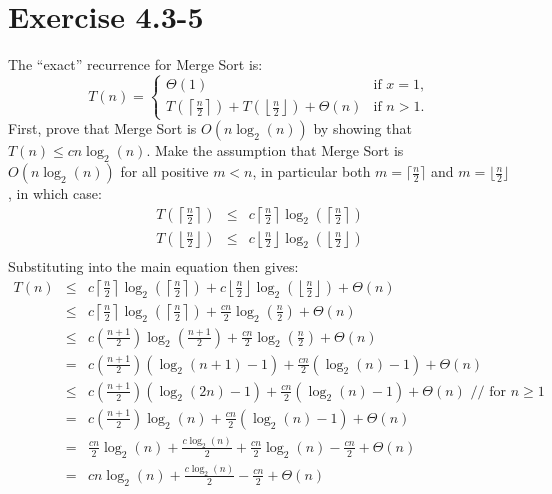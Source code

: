 \documentclass{article}
\begin{document}
\section*{Exercise 4.3-5}


The ``exact'' recurrence for Merge Sort is:
\begin{equation*} T(n) = \begin{cases} \Theta(1) & \text{if } x=1,\\ T\left(\left\lceil \frac{n}{2} \right\rceil\right) + T\left(\left\lfloor \frac{n}{2} \right\rfloor\right) + \Theta(n) & \text{if } n > 1.
	\end{cases}
\end{equation*}
First, prove that Merge Sort is $O(n\log_2(n))$ by showing that $T(n) \leq cn\log_2(n)$.  Make the assumption that Merge Sort is $O(n\log_2(n))$ for all positive $m < n$, in particular both $m = \lceil \frac{n}{2} \rceil$ and $m = \lfloor \frac{n}{2} \rfloor$, in which case:
\begin{eqnarray*}
	T\left(\left\lceil \frac{n}{2} \right\rceil\right) &\leq& c\left\lceil\frac{n}{2}\right\rceil \log_2\left(\left\lceil\frac{n}{2}\right\rceil\right) \\
	T\left(\left\lfloor \frac{n}{2} \right\rfloor\right) &\leq& c\left\lfloor\frac{n}{2}\right\rfloor \log_2\left(\left\lfloor\frac{n}{2}\right\rfloor\right) \\
\end{eqnarray*}
Substituting into the main equation then gives:
\begin{eqnarray*}
	T(n) &\leq& c\left\lceil \frac{n}{2} \right\rceil \log_2\left(\left\lceil \frac{n}{2} \right\rceil\right) + c\left\lfloor \frac{n}{2} \right\rfloor \log_2\left(\left\lfloor \frac{n}{2} \right\rfloor\right) + \Theta(n) \\
	 &\leq& c\left\lceil \frac{n}{2} \right\rceil \log_2\left(\left\lceil \frac{n}{2} \right\rceil\right) + \frac{cn}{2} \log_2\left(\frac{n}{2}\right) + \Theta(n) \\
	 &\leq& c\left(\frac{n+1}{2}\right) \log_2\left(\frac{n+1}{2}\right) + \frac{cn}{2} \log_2\left(\frac{n}{2}\right) + \Theta(n) \\
	 &=& c\left(\frac{n+1}{2}\right)(\log_2(n+1)-1) + \frac{cn}{2}(\log_2(n)-1) + \Theta(n) \\
	 &\leq& c\left(\frac{n+1}{2}\right)(\log_2(2n)-1) + \frac{cn}{2}(\log_2(n)-1) + \Theta(n) \text{ // for }n \geq 1 \\
	 &=& c\left(\frac{n+1}{2}\right)\log_2(n) + \frac{cn}{2}(\log_2(n)-1) + \Theta(n) \\
	 &=& \frac{cn}{2}\log_2(n) + \frac{c\log_2(n)}{2} + \frac{cn}{2}\log_2(n) - \frac{cn}{2} + \Theta(n) \\
	 &=& cn\log_2(n) + \frac{c\log_2(n)}{2} - \frac{cn}{2} + \Theta(n) \\
\end{eqnarray*}
\end{document}
